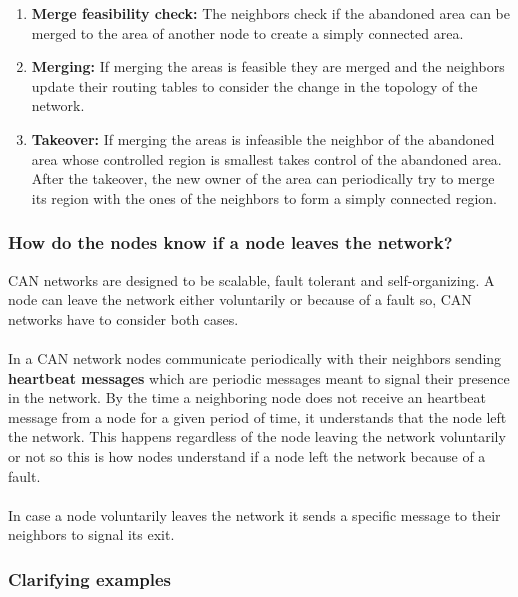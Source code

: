 \documentclass{scrbook}
\begin{document}
\begin{itemize}
  \begin{enumerate}
  
  \item 
  \textbf{Merge feasibility check:} The neighbors
  check if the abandoned area can be merged to the area of another node
  to create a simply connected area.
  
  \item 
  \textbf{Merging:} If merging the
  areas is feasible they are merged and the neighbors update their
  routing tables to consider the change in the topology of the network.

  \item
  \textbf{Takeover:} If merging the areas is infeasible the neighbor of
  the abandoned area whose controlled region is smallest takes control
  of the abandoned area. After the takeover, the new owner of the area
  can periodically try to merge its region with the ones of the
  neighbors to form a simply connected region.
  
  \end{enumerate}
\end{itemize}

\subsubsection{How do the nodes know if a node leaves the
network?}

CAN networks are designed to be scalable, fault tolerant and
self-organizing. A node can leave the network either voluntarily or
because of a fault so, CAN networks have to consider both cases. \\ \\
In a CAN network nodes communicate periodically with their neighbors
sending \textbf{heartbeat messages} which are periodic messages meant to
signal their presence in the network. By the time a neighboring node
does not receive an heartbeat message from a node for a given period of
time, it understands that the node left the network. This happens
regardless of the node leaving the network voluntarily or not so this is
how nodes understand if a node left the network because of a fault. \\ \\
In case a node voluntarily leaves the network it sends a specific
message to their neighbors to signal its exit.

\subsubsection{Clarifying examples}
\end{document}
